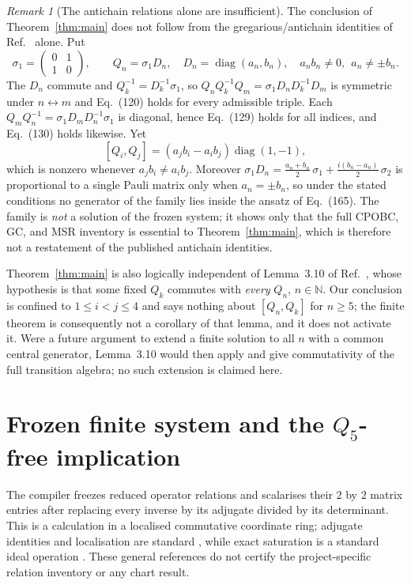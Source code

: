 \documentclass[11pt]{article}
\theoremstyle{remark}
\newtheorem{remark}{Remark}
\theoremstyle{plain}
\begin{document}
\begin{remark}[The antichain relations alone are insufficient]
\label{rem:sharpness}
The conclusion of Theorem~\ref{thm:main} does not follow from the
gregarious/antichain identities of Ref.~\cite{SrivastavaSurya2026} alone.
Put
\[
  \sigma_1=\begin{pmatrix}0&1\\1&0\end{pmatrix},\qquad
  Q_n=\sigma_1 D_n,\quad D_n=\operatorname{diag}(a_n,b_n),\quad
  a_nb_n\neq0,\ \ a_n\neq\pm b_n .
\]
The \(D_n\) commute and \(Q_k^{-1}=D_k^{-1}\sigma_1\), so
\(Q_nQ_k^{-1}Q_m=\sigma_1D_nD_k^{-1}D_m\) is symmetric under
\(n\leftrightarrow m\) and Eq.\ (120) holds for every admissible triple.
Each \(Q_mQ_n^{-1}=\sigma_1D_mD_n^{-1}\sigma_1\) is diagonal, hence
Eq.\ (129) holds for all indices, and Eq.\ (130) holds likewise.  Yet
\[
  [Q_i,Q_j]=(a_jb_i-a_ib_j)\operatorname{diag}(1,-1),
\]
which is nonzero whenever \(a_jb_i\neq a_ib_j\).  Moreover
\(\sigma_1D_n=\tfrac{a_n+b_n}{2}\,\sigma_1
+\tfrac{i(b_n-a_n)}{2}\,\sigma_2\) is proportional to a single Pauli
matrix only when \(a_n=\pm b_n\), so under the stated conditions no
generator of the family lies inside the ansatz of Eq.\ (165).  The family
is \emph{not} a solution of the frozen system; it shows only that the full
CPOBC, GC, and MSR inventory is essential to Theorem~\ref{thm:main}, which
is therefore not a restatement of the published antichain identities.
\end{remark}

Theorem~\ref{thm:main} is also logically independent of Lemma~3.10 of
Ref.~\cite{SrivastavaSurya2026}, whose hypothesis is that some fixed
\(Q_k\) commutes with \emph{every} \(Q_n\), \(n\in\mathbb{N}\).  Our
conclusion is confined to \(1\leq i<j\leq4\) and says nothing about
\([Q_n,Q_k]\) for \(n\geq5\); the finite theorem is consequently not a
corollary of that lemma, and it does not activate it.  Were a future
argument to extend a finite solution to all \(n\) with a common central
generator, Lemma~3.10 would then apply and give commutativity of the full
transition algebra; no such extension is claimed here.

\section{Frozen finite system and the
  \texorpdfstring{\(Q_5\)}{Q5}-free implication}

The compiler freezes reduced operator relations and scalarises their
\(2\) by \(2\) matrix entries after replacing every inverse by its
adjugate divided by its determinant.  This is a calculation in a
localised commutative coordinate ring; adjugate identities and
localisation are standard \cite{StacksAlgebra,MaraisRen2015}, while exact
saturation is a standard ideal operation \cite{BerthomieuEtAl2023}.
These general references do not certify the project-specific relation
inventory or any chart result.
\end{document}
